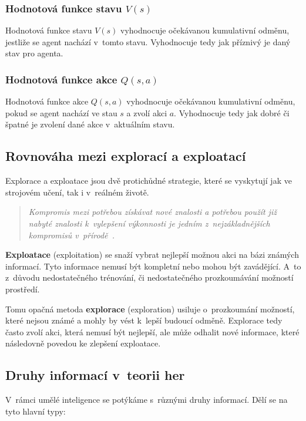 \subsubsection*{Hodnotová funkce stavu $V(s)$}

Hodnotová funkce stavu \emph{$V(s)$} vyhodnocuje očekávanou kumulativní odměnu, jestliže se agent nachází v~tomto stavu.
Vyhodnocuje tedy jak příznivý je daný stav pro agenta.

\subsubsection*{Hodnotová funkce akce $Q(s, a)$}
\label{subsubsec:q_function}

Hodnotová funkce akce \emph{$Q(s, a)$} vyhodnocuje očekávanou kumulativní odměnu, pokud se agent nachází ve stau $s$ a zvolí akci $a$.
Vyhodnocuje tedy jak dobré či špatné je zvolení dané akce v~aktuálním stavu.


\subsection{Rovnováha mezi explorací a exploatací}
\label{subsec:exploration-exploitation-dillemma}
Explorace a exploatace jsou dvě protichůdné strategie, které se vyskytují jak ve strojovém učení, tak i v~reálném životě.
\begin{quote}
  \emph{Kompromis mezi potřebou získávat nové znalosti a potřebou použít již nabyté znalosti k~vylepšení výkonnosti je jedním z~nejzákladnějších kompromisů v~přírodě~\cite{Exploitation_Exploration}.}
\end{quote}


\textbf{Exploatace} (exploitation) se snaží vybrat nejlepší možnou akci na bázi známých informací.
Tyto informace nemusí být kompletní nebo mohou být zavádějící.
A~to z~důvodu nedostatečného trénování, či nedostatečného prozkoumávání možností prostředí.

Tomu opačná metoda \textbf{explorace} (exploration) usiluje o~prozkoumání možností, které nejsou známé a mohly by vést k~lepší budoucí odměně.
Explorace tedy často zvolí akci, která nemusí být nejlepší, ale může odhalit nové informace, které následovně povedou ke zlepšení exploatace.

\subsection{Druhy informací v~teorii her}\label{subsec:druhy-informaci-v-teorii-her}
V~rámci umělé inteligence se potýkáme s~různými druhy informací.
Dělí se na tyto hlavní typy:

